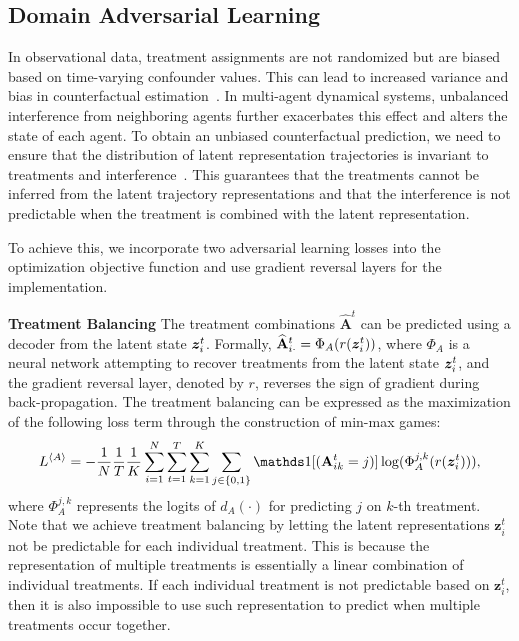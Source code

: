 \subsection{Domain Adversarial Learning}
In observational data, treatment assignments are not randomized but are biased based on time-varying confounder values. This can lead to increased variance and bias in counterfactual estimation~\cite{seedat2022continuous}. In multi-agent dynamical systems, unbalanced interference from neighboring agents further exacerbates this effect and alters the state of each agent. To obtain an unbiased counterfactual prediction, we need to ensure that the distribution of latent representation trajectories is invariant to treatments and interference~\cite{anonymous2023cfgode}. This guarantees that the treatments cannot be inferred from the latent trajectory representations and that the interference is not predictable when the treatment is combined with the latent representation.

To achieve this, we incorporate two adversarial learning losses into the optimization objective function and use gradient reversal layers for the implementation.


\textbf{Treatment Balancing} The treatment combinations $\hat{\mathbf{A}}^t$ can be predicted using  a decoder from the latent state $\bm{z}_i^t$. Formally, $\widehat{\mathbf{A}}_{i\cdot}^t = \Phi_{A}(r(\bm{z}_i^t))$, where $\Phi_A$ is a neural network attempting to recover treatments from the latent state $\bm{z}_i^t$, and the gradient reversal layer, denoted by $r$, reverses the sign of gradient during back-propagation. 
The treatment balancing can be expressed as the maximization of the following loss term through the construction of min-max games:
\begin{align*}
    L^{\left< A \right> } = - \frac{1}{N}\frac{1}{T}\frac{1}{K}\sum_{i=1}^N\sum_{t=1}^T\sum_{k=1}^{K} \sum_{j\in\{0,1\}} \ind[(\mathbf{A}^t_{ik} =j)]  \log ( \Phi^{j,k}_A(r(\bz_i^t))),
\end{align*}
where $\Phi^{j,k}_A$ represents the logits of $d_A(\cdot)$ for predicting $j$ on $k$-th treatment. 
Note that we achieve treatment balancing by letting the latent representations $\bm{z}_i^t$ not be predictable for each individual treatment. This is because the representation of multiple treatments is essentially a linear combination of individual treatments. If each individual treatment is not predictable based on $\bm{z}_i^t$, then it is also impossible to use such representation to predict when multiple treatments occur together.


